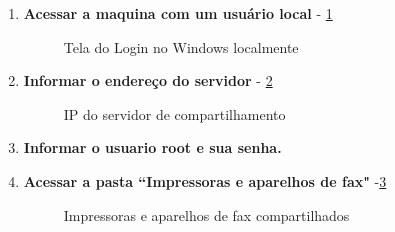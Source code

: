 \begin{enumerate}
	\item \textbf{Acessar a maquina com um usuário local} - \ref{login_windows_local}
		\begin{figure}[ht]
		   	\centering
		   	\caption{Tela do Login no Windows localmente}
		    \label{login_windows_local}
		\end{figure}
		
	\item \textbf{Informar o endereço do servidor} - \ref{server_ip}	
	\begin{figure}[ht]
	   	\centering
	   	\caption{IP do servidor de compartilhamento}
	    \label{server_ip}
	\end{figure}
		
\pagebreak
	
	\item \textbf{Informar o usuario root e sua senha.}	
	
	\item \textbf{Acessar a pasta ``Impressoras e aparelhos de fax"} -\ref{impressora_aparelho_fax}
	\begin{figure}[ht]
	   	\centering
	   	\caption{Impressoras e aparelhos de fax compartilhados}
	    \label{impressora_aparelho_fax}
	\end{figure}


\end{enumerate}
